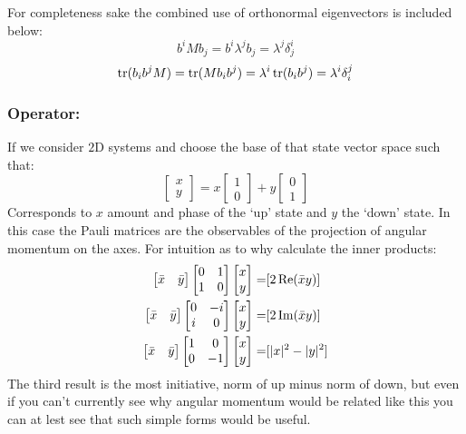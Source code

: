 For completeness sake the combined use of orthonormal eigenvectors is included below:
\[b^iMb_j = b^i\lambda^j b_j = \lambda^j\delta^i_j\]
\[\operatorname{tr}(b_ib^jM) = \operatorname{tr}(Mb_ib^j) = \lambda^i\operatorname{tr}(b_ib^j) = \lambda^i\delta_i^j\]

\subsubsection{Operator:}
If we consider $2$D systems and choose the base of that state vector space such that:
\[\begin{bmatrix}x\\y\end{bmatrix} = x\begin{bmatrix}1\\0\end{bmatrix}+y\begin{bmatrix}0\\1\end{bmatrix}\]
Corresponds to $x$ amount and phase of the `up' state and $y$ the `down' state.
In this case the Pauli matrices are the observables of the projection of angular momentum on the axes.
For intuition as to why calculate the inner products:
\[\begin{aligned}
	\begin{bmatrix}\bar{x}&\bar{y}\end{bmatrix}\begin{bmatrix}0&1\\1&0\end{bmatrix}\begin{bmatrix}x\\y\end{bmatrix}=&[2\operatorname{Re}(\bar{x}y)]\\
	\begin{bmatrix}\bar{x}&\bar{y}\end{bmatrix}\begin{bmatrix}0&-i\\i&0\end{bmatrix}\begin{bmatrix}x\\y\end{bmatrix}=&[2\operatorname{Im}(\bar{x}y)]\\
	\begin{bmatrix}\bar{x}&\bar{y}\end{bmatrix}\begin{bmatrix}1&0\\0&-1\end{bmatrix}\begin{bmatrix}x\\y\end{bmatrix}=&[|x|^2-|y|^2]\\
\end{aligned}\]
The third result is the most initiative,
norm of up minus norm of down,
but even if you can't currently see why angular momentum would be related like this you can at lest see that such simple forms would be useful.
\\

